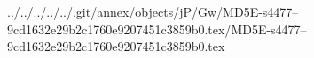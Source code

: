 ../../../../../.git/annex/objects/jP/Gw/MD5E-s4477--9cd1632e29b2c1760e9207451c3859b0.tex/MD5E-s4477--9cd1632e29b2c1760e9207451c3859b0.tex